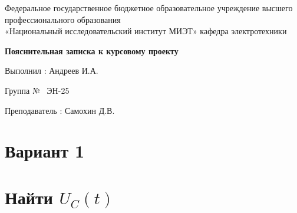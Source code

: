 \documentclass[12pt]{article}
\begin{document}

\begin{center}
	
Федеральное государственное бюджетное образовательное учреждение высшего\\
профессионального образования\\
«Национальный исследовательский институт МИЭТ»
\vskip2cm
кафедра электротехники
\vskip2cm
{
  \setlength{\parindent}{0pt}
  \linespread{1.5}\selectfont %
  \centering\titletimesnewroman\bfseries
  Пояснительная записка к курсовому проекту\par
  \titletimesnewroman\bfseries
  \par
  \par
}
\end{center}

\vskip8cm

{
  \linespread{1.1}\selectfont

  \noindent Выполнил : Андреев И.А. \par
  \noindent Группа №~ ЭН-25 \par
  \vskip0.5cm
  \noindent Преподаватель : Самохин Д.В.\par
}

\addtolength{\footskip}{-6mm}%
\thispagestyle{titlepage}

\clearpage
\addtolength{\footskip}{6mm}%

\section*{\centering Вариант 1}

\section{Найти $U_C(t)$}
\end{document}
